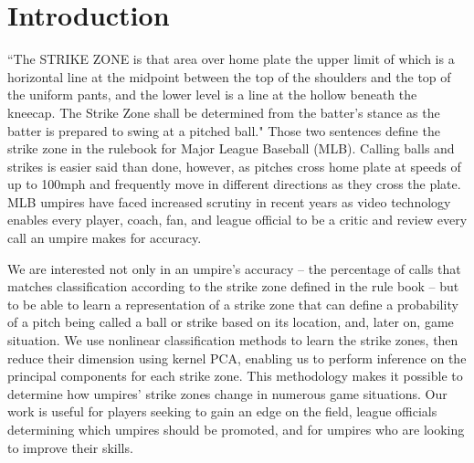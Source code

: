\documentclass[letterpaper,12pt]{article}
\begin{document}
\section{Introduction}\label{sec:intro}

``The STRIKE ZONE is that area over home plate the upper limit of which is a horizontal line at the midpoint between the top of the shoulders and the top of the uniform pants, and the lower level is a line at the hollow beneath the kneecap. 
The Strike Zone shall be determined from the batter’s stance as the batter is prepared to swing at a pitched ball."\cite{mlbrules}
Those two sentences define the strike zone in the rulebook for Major League Baseball (MLB). 
Calling balls and strikes is easier said than done, however, as pitches cross home plate at speeds of up to 100mph and frequently move in different directions as they cross the plate. 
MLB umpires have faced increased scrutiny in recent years as video technology enables every player, coach, fan, and league official to be a critic and review every call an umpire makes for accuracy. 

We are interested not only in an umpire's accuracy -- the percentage of calls that matches classification according to the strike zone defined in the rule book -- but to be able to learn a representation of a strike zone that can define a probability of a pitch being called a ball or strike based on its location, and, later on, game situation.
We use nonlinear classification methods to learn the strike zones, then reduce their dimension using kernel PCA, enabling us to perform inference on the principal components for each strike zone. 
This methodology makes it possible to determine how umpires' strike zones change in numerous game situations. 
Our work is useful for players seeking to gain an edge on the field, league officials determining which umpires should be promoted, and for umpires who are looking to improve their skills. 

\end{document}

